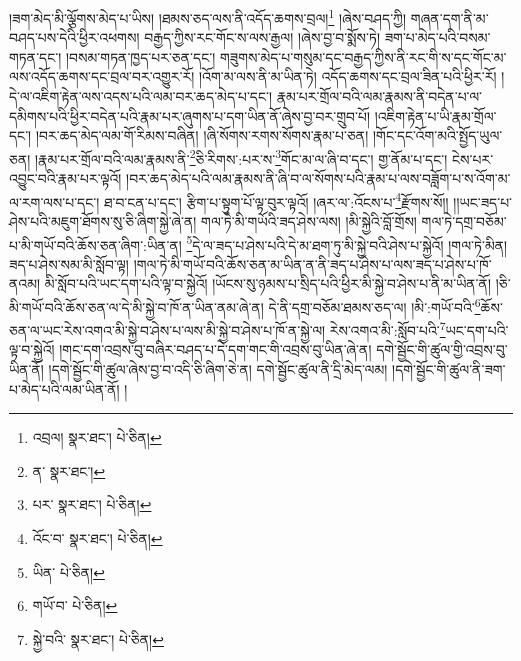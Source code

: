 །ཟག་མེད་མི་ལྕོགས་མེད་པ་ཡིས། །ཐམས་ཅད་ལས་ནི་འདོད་ཆགས་བྲལ།\footnote{འབྲལ།  སྣར་ཐང་།  པེ་ཅིན། } །ཞེས་བཤད་ཀྱི། གཞན་དག་ནི་མ་བཤད་པས་དེའི་ཕྱིར་འཕགས། བརྒྱད་ཀྱིས་རང་གོང་ས་ལས་རྒྱལ། །ཞེས་བྱ་བ་སྨོས་ཏེ། ཟག་པ་མེད་པའི་བསམ་གཏན་དང་། །བསམ་གཏན་ཁྱད་པར་ཅན་དང་། གཟུགས་མེད་པ་གསུམ་དང་བརྒྱད་ཀྱིས་ནི་རང་གི་ས་དང་གོང་མ་ལས་འདོད་ཆགས་དང་བྲལ་བར་འགྱུར་རོ། །འོག་མ་ལས་ནི་མ་ཡིན་ཏེ། འདོད་ཆགས་དང་བྲལ་ཟིན་པའི་ཕྱིར་རོ། །དེ་ལ་འཇིག་རྟེན་ལས་འདས་པའི་ལམ་བར་ཆད་མེད་པ་དང་། རྣམ་པར་གྲོལ་བའི་ལམ་རྣམས་ནི་བདེན་པ་ལ་དམིགས་པའི་ཕྱིར་བདེན་པའི་རྣམ་པར་ཞུགས་པ་དག་ཡིན་ནོ་ཞེས་བྱ་བར་གྲུབ་པོ། །འཇིག་རྟེན་པ་ཡི་རྣམ་གྲོལ་དང་། །བར་ཆད་མེད་ལམ་གོ་རིམས་བཞིན། །ཞི་སོགས་རགས་སོགས་རྣམ་པ་ཅན། །གོང་དང་འོག་མའི་སྤྱོད་ཡུལ་ཅན། །རྣམ་པར་གྲོལ་བའི་ལམ་རྣམས་ནི་\footnote{ན་  སྣར་ཐང་། }ཅི་རིགས་:པར་ས་\footnote{པར་  སྣར་ཐང་།  པེ་ཅིན། }གོང་མ་ལ་ཞི་བ་དང་། གྱ་ནོམ་པ་དང་། ངེས་པར་འབྱུང་བའི་རྣམ་པར་ལྟའོ། །བར་ཆད་མེད་པའི་ལམ་རྣམས་ནི་ཞི་བ་ལ་སོགས་པའི་རྣམ་པ་ལས་བཟློག་པ་ས་འོག་མ་ལ་རག་ལས་པ་དང་། ཐ་བ་ངན་པ་དང་། རྩིག་པ་སྟུག་པོ་ལྟ་བུར་ལྟའོ། །ཞར་ལ་:འོངས་པ་\footnote{འོང་བ་  སྣར་ཐང་།  པེ་ཅིན། }རྫོགས་སོ།། །།ཡང་ཟད་པ་ཤེས་པའི་མཇུག་ཐོགས་སུ་ཅི་ཞིག་སྐྱེ་ཞེ་ན། གལ་ཏེ་མི་གཡོའི་ཟད་ཤེས་ལས། །མི་སྐྱེའི་བློ་གྲོས། གལ་ཏེ་དགྲ་བཅོམ་པ་མི་གཡོ་བའི་ཆོས་ཅན་ཞིག་:ཡིན་ན། \footnote{ཡིན་  པེ་ཅིན། }དེ་ལ་ཟད་པ་ཤེས་པའི་དེ་མ་ཐག་ཏུ་མི་སྐྱེ་བའི་ཤེས་པ་སྐྱེའོ། །གལ་ཏེ་མིན། ཟད་པ་ཤེས་སམ་མི་སློབ་ལྟ། །གལ་ཏེ་མི་གཡོ་བའི་ཆོས་ཅན་མ་ཡིན་ན་ནི་ཟད་པ་ཤེས་པ་ལས་ཟད་པ་ཤེས་པ་ཁོ་ནའམ། མི་སློབ་པའི་ཡང་དག་པའི་ལྟ་བ་སྐྱེའོ། །ཡོངས་སུ་ཉམས་པ་སྲིད་པའི་ཕྱིར་མི་སྐྱེ་བ་ཤེས་པ་ནི་མ་ཡིན་ནོ། །ཅི་མི་གཡོ་བའི་ཆོས་ཅན་ལ་དེ་མི་སྐྱེ་བ་ཁོ་ན་ཡིན་ནམ་ཞེ་ན། དེ་ནི་དགྲ་བཅོམ་ཐམས་ཅད་ལ། །མི་:གཡོ་བའི་\footnote{གཡོ་བ་  པེ་ཅིན། }ཆོས་ཅན་ལ་ཡང་རེས་འགའ་མི་སྐྱེ་བ་ཤེས་པ་ལས་མི་སྐྱེ་བ་ཤེས་པ་ཁོ་ན་སྐྱེ་ལ། རེས་འགའ་མི་:སློབ་པའི་\footnote{སྐྱེ་བའི་  སྣར་ཐང་།  པེ་ཅིན། }ཡང་དག་པའི་ལྟ་བ་སྐྱེའོ། །གང་དག་འབྲས་བུ་བཞིར་བཤད་པ་དེ་དག་གང་གི་འབྲས་བུ་ཡིན་ཞེ་ན། དགེ་སྦྱོང་གི་ཚུལ་གྱི་འབྲས་བུ་ཡིན་ནོ། །དགེ་སྦྱོང་གི་ཚུལ་ཞེས་བྱ་བ་འདི་ཅི་ཞིག་ཅེ་ན། དགེ་སྦྱོང་ཚུལ་ནི་དྲི་མེད་ལམ། །དགེ་སྦྱོང་གི་ཚུལ་ནི་ཟག་པ་མེད་པའི་ལམ་ཡིན་ནོ། །
